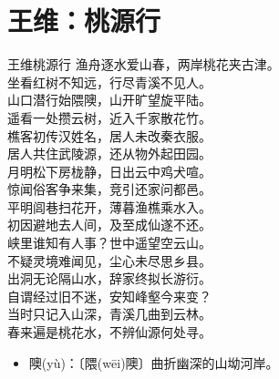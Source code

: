 \documentclass[12pt,oneside,a5paper]{book}
\begin{document}
\chapter{王维：桃源行}
\begin{poemzh}{王维}{桃源行}
渔舟逐水爱山春，两岸桃花夹古津。\\
坐看红树不知远，行尽青溪不见人。\\
山口潜行始隈隩，山开旷望旋平陆。\\
遥看一处攒云树，近入千家散花竹。\\
樵客初传汉姓名，居人未改秦衣服。\\
居人共住武陵源，还从物外起田园。\\
月明松下房栊静，日出云中鸡犬喧。\\
惊闻俗客争来集，竞引还家问都邑。\\
平明闾巷扫花开，薄暮渔樵乘水入。\\
初因避地去人间，及至成仙遂不还。\\
峡里谁知有人事？世中遥望空云山。\\
不疑灵境难闻见，尘心未尽思乡县。\\
出洞无论隔山水，辞家终拟长游衍。\\
自谓经过旧不迷，安知峰壑今来变？\\
当时只记入山深，青溪几曲到云林。\\
春来遍是桃花水，不辨仙源何处寻。\\ 
\end{poemzh}

\begin{itemize}
\item 隩(yù)：〔隈(wēi)隩〕曲折幽深的山坳河岸。
\end{itemize}
\end{document}

